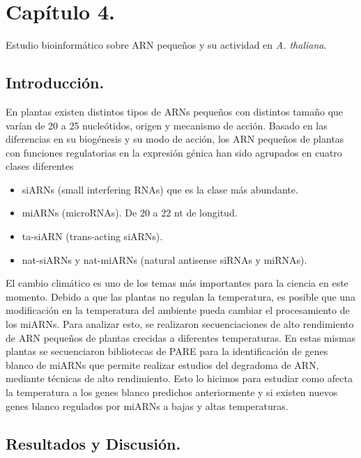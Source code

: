 
\graphicspath{{Chapter4/Figs/}}

\setcounter{chapter}{7}
\chapter*{Capítulo 4.} 
\setcounter{figure}{0}
\setcounter{table}{0}
\setcounter{section}{0}

{\LARGE Estudio bioinformático sobre ARN pequeños y su actividad en \textit{A. thaliana}.}

\section{Introducción.}

En plantas existen distintos tipos de ARNs pequeños con distintos tamaño que varían de 20 a 25 nucleótidos, origen y mecanismo de acción.
Basado en las diferencias en su biogénesis y su modo de acción, los ARN pequeños de plantas con funciones regulatorias en la expresión génica han sido agrupados en cuatro clases diferentes
\begin{itemize}
	\item siARNs 	(small interfering RNAs) que es la clase más abundante. 
	\item miARNs (microRNAs). De 20 a 22 nt de longitud.
	\item ta-siARN (trans-acting siARNs).
	\item nat-siARNs y nat-miARNs (natural antisense siRNAs y miRNAs).
\end{itemize}

El cambio climático es uno de los temas más importantes para la ciencia en este momento. 
Debido a que las plantas no regulan la temperatura, es posible que una modificación en la temperatura del ambiente pueda cambiar el procesamiento de los miARNs.
Para analizar esto, se realizaron secuenciaciones de alto rendimiento de ARN pequeños de plantas crecidas a diferentes temperaturas.
En estas mismas plantas se secuenciaron bibliotecas de PARE \citep{pmid19247285} para la identificación de genes blanco de miARNs que permite realizar estudios del degradoma de ARN, mediante técnicas de alto rendimiento.
Esto lo hicimos para estudiar como afecta la temperatura a los genes blanco predichos anteriormente y si existen nuevos genes blanco regulados por miARNs a bajas y altas temperaturas.

\section{Resultados y Discusión.}

